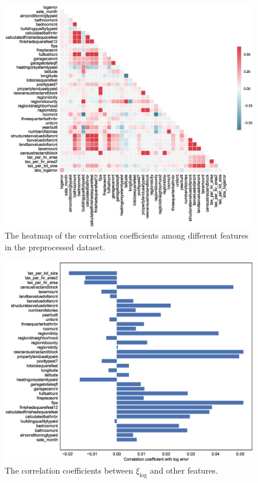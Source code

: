 \documentclass[12pt]{article}
\begin{document}
\begin{figure}[!ht]
	\centering
	\includegraphics[width=1\linewidth]{pic/corr-train-data}
	\caption{The heatmap of the correlation coefficients among different features in the preprocessed dataset.}
	\label{fig:corr-train-data}
\end{figure}

\begin{figure}[!ht]
	\centering
	\includegraphics[width=1\linewidth]{pic/corr-features-vs-error}
	\caption{The correlation coefficients between $\xi_{\log}$ and other features.}
	\label{fig:corr-features-vs-error}
\end{figure}
\end{document}
